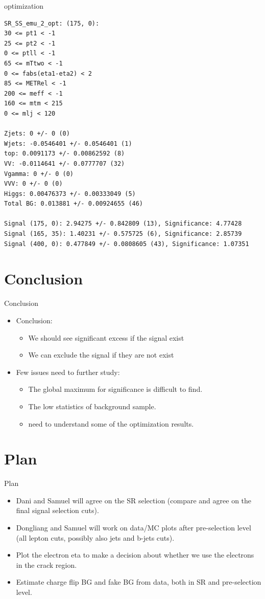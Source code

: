 \documentclass[mathserif,serif]{beamer}
\begin{document}
\begin{frame}[fragile]{optimization}
\tiny
\begin{verbatim}
SR_SS_emu_2_opt: (175, 0):
30 <= pt1 < -1
25 <= pt2 < -1
0 <= ptll < -1
65 <= mTtwo < -1
0 <= fabs(eta1-eta2) < 2
85 <= METRel < -1
200 <= meff < -1
160 <= mtm < 215
0 <= mlj < 120

Zjets: 0 +/- 0 (0)
Wjets: -0.0546401 +/- 0.0546401 (1)
top: 0.0091173 +/- 0.00862592 (8)
VV: -0.0114641 +/- 0.0777707 (32)
Vgamma: 0 +/- 0 (0)
VVV: 0 +/- 0 (0)
Higgs: 0.00476373 +/- 0.00333049 (5)
Total BG: 0.013881 +/- 0.00924655 (46)

Signal (175, 0): 2.94275 +/- 0.842809 (13), Significance: 4.77428
Signal (165, 35): 1.40231 +/- 0.575725 (6), Significance: 2.85739
Signal (400, 0): 0.477849 +/- 0.0808605 (43), Significance: 1.07351
\end{verbatim}
\end{frame}

\section{Conclusion}
\begin{frame}{Conclusion}
\begin{itemize}
\item Conclusion:
\begin{itemize}
\item We should see significant excess if the signal exist
\item We can exclude the signal if they are not exist
\end{itemize}
\item Few issues need to further study:
\begin{itemize}
\item The global maximum for significance is difficult to find.
\item The low statistics of background sample.
\item need to understand some of the optimization results.
\end{itemize}
\end{itemize}
\end{frame}

\section{Plan}
\begin{frame}{Plan}
\begin{itemize}
\item Dani and Samuel will agree on the SR selection (compare and agree on the final signal selection cuts).
\item Dongliang and Samuel will work on data/MC plots after pre-selection level (all lepton cuts, possibly also jets and b-jets cuts).
\item Plot the electron eta to make a decision about whether we use the electrons in the crack region.
\item Estimate charge flip BG and fake BG from data, both in SR and pre-selection level.
\end{itemize}
\end{frame}
\end{document}
